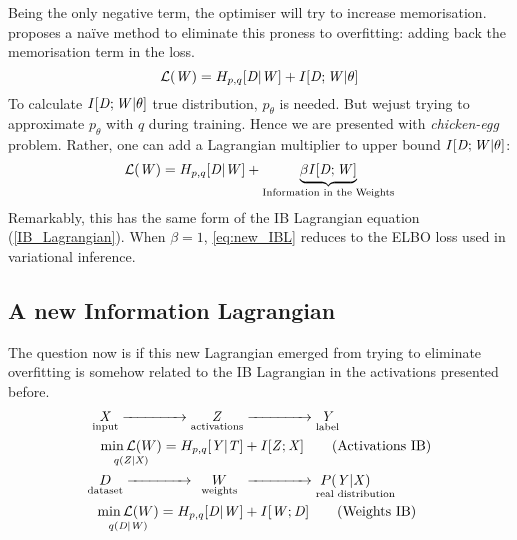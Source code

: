 Being the only negative term, the optimiser will try to increase memorisation. \cite{achille:2017emergence} proposes a naïve method to eliminate this proness to overfitting: adding back the memorisation term in the loss.
  \begin{equation}
    \mathcal{L}({\mathit{W}}) = H_{p,q}[{\mathit{D}}|{\mathit{W}}] + I[{\mathit{D}};{\mathit{W}}|\theta]
  \end{equation}
To calculate $I[{\mathit{D}};{\mathit{W}}|\theta]$ true distribution, $p_\theta$ is needed. But wejust trying to approximate $p_\theta$ with $q$ during training. Hence we are presented with \emph{chicken-egg} problem. Rather, one can add a Lagrangian multiplier to upper bound $I[{\mathit{D}};{\mathit{W}}|\theta]$:
  \begin{equation}
    \mathcal{L}({\mathit{W}}) = H_{p,q}[{\mathit{D}}|{\mathit{W}}] + \underbrace{\beta I[{\mathit{D}};{\mathit{W}}] }_{\text{Information in the Weights}}  \label{eq:new_IBL}
  \end{equation}
Remarkably, this has the same form of the IB Lagrangian equation (\cref{IB_Lagrangian}). When $\beta=1$, \eqref{eq:new_IBL} reduces to the ELBO loss used in variational inference\cite[p. 53]{achille:2019phd}.

\subsection{A new Information Lagrangian}
The question now is if this new Lagrangian emerged from trying to eliminate overfitting is somehow related to the IB Lagrangian in the activations presented before.
\begin{align*}
  \underset{\text{input}}{{\mathit{X}}} \xrightarrow{\hspace*{1.4cm}}\underset{\text{activations}}{{\mathit{Z}}}& \xrightarrow{\hspace*{1.4cm}}\underset{\text{label}}{{\mathit{Y}}}\\
  \underset{q({\mathit{Z}}|{\mathit{X}})}{\min\mathcal{L}(W)} = H_{p,q}[{\mathit{Y}}|{\mathit{T}}]& + I[{{\mathit{Z}}};{{\mathit{X}}}] \tag{Activations IB}\\
  \underset{\text{dataset}}{D} \xrightarrow{\hspace*{1.4cm}}\underset{\hspace*{.15cm}\text{weights}\hspace*{.15cm}}{W}& \xrightarrow{\hspace*{1.4cm}}\underset{\text{real distribution}}{P({\mathit{Y}}|{\mathit{X}})\hspace*{.5cm}}\\
  \underset{q({\mathit{D}}|{\mathit{W}})}{\min\mathcal{L}(W)} = H_{p,q}[{\mathit{D}}|{\mathit{W}}]& + I[{{\mathit{W}}};{{\mathit{D}}}] \tag{Weights IB}\\
\end{align*}

